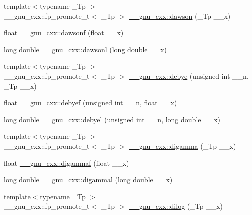 \begin{DoxyCompactItemize}
\item 
{\footnotesize template$<$typename \+\_\+\+Tp $>$ }\\\+\_\+\+\_\+gnu\+\_\+cxx\+::fp\+\_\+promote\+\_\+t$<$ \+\_\+\+Tp $>$ \hyperlink{group__gnu__math__spec__func_gabc97cbc04fdd23593e8dccbc1421dad5}{\+\_\+\+\_\+gnu\+\_\+cxx\+::dawson} (\+\_\+\+Tp \+\_\+\+\_\+x)
\item 
float \hyperlink{group__gnu__math__spec__func_ga0a1b8e6760b8c7869127d41d96209318}{\+\_\+\+\_\+gnu\+\_\+cxx\+::dawsonf} (float \+\_\+\+\_\+x)
\item 
long double \hyperlink{group__gnu__math__spec__func_ga6647a7444ff9c7c1f2a8ed36761bfeb2}{\+\_\+\+\_\+gnu\+\_\+cxx\+::dawsonl} (long double \+\_\+\+\_\+x)
\item 
{\footnotesize template$<$typename \+\_\+\+Tp $>$ }\\\+\_\+\+\_\+gnu\+\_\+cxx\+::fp\+\_\+promote\+\_\+t$<$ \+\_\+\+Tp $>$ \hyperlink{group__gnu__math__spec__func_ga0b14de47c011de3ebf771c9f29b2b78c}{\+\_\+\+\_\+gnu\+\_\+cxx\+::debye} (unsigned int \+\_\+\+\_\+n, \+\_\+\+Tp \+\_\+\+\_\+x)
\item 
float \hyperlink{group__gnu__math__spec__func_ga683d3a885913b52db128aa5d624984a4}{\+\_\+\+\_\+gnu\+\_\+cxx\+::debyef} (unsigned int \+\_\+\+\_\+n, float \+\_\+\+\_\+x)
\item 
long double \hyperlink{group__gnu__math__spec__func_ga2db11e767b89bbd36be6ebfadda3401f}{\+\_\+\+\_\+gnu\+\_\+cxx\+::debyel} (unsigned int \+\_\+\+\_\+n, long double \+\_\+\+\_\+x)
\item 
{\footnotesize template$<$typename \+\_\+\+Tp $>$ }\\\+\_\+\+\_\+gnu\+\_\+cxx\+::fp\+\_\+promote\+\_\+t$<$ \+\_\+\+Tp $>$ \hyperlink{group__gnu__math__spec__func_ga7b87300edf8754d959e1d94fe0c9246e}{\+\_\+\+\_\+gnu\+\_\+cxx\+::digamma} (\+\_\+\+Tp \+\_\+\+\_\+x)
\item 
float \hyperlink{group__gnu__math__spec__func_ga65b58ffe1d02ccda1113539b62d87b94}{\+\_\+\+\_\+gnu\+\_\+cxx\+::digammaf} (float \+\_\+\+\_\+x)
\item 
long double \hyperlink{group__gnu__math__spec__func_gaaa1bf1503709175915cb81bcd4355ccf}{\+\_\+\+\_\+gnu\+\_\+cxx\+::digammal} (long double \+\_\+\+\_\+x)
\item 
{\footnotesize template$<$typename \+\_\+\+Tp $>$ }\\\+\_\+\+\_\+gnu\+\_\+cxx\+::fp\+\_\+promote\+\_\+t$<$ \+\_\+\+Tp $>$ \hyperlink{group__gnu__math__spec__func_ga4185ee1a0f9189a18085f65d52b6bc9b}{\+\_\+\+\_\+gnu\+\_\+cxx\+::dilog} (\+\_\+\+Tp \+\_\+\+\_\+x)

\end{DoxyCompactItemize}

